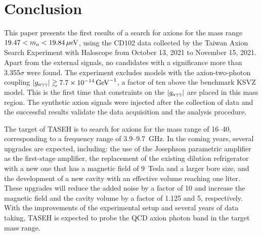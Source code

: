 \section{Conclusion} \label{sec:conclusion}
This paper presents the first results of a search for axions for the mass 
range $19.47 < m_a < 19.84 \,\mu\text{e\hspace{-.08em}V}$, using the CD102 data collected by the 
Taiwan Axion Search Experiment with Haloscope from October 13, 2021 
to November 15, 2021. 
Apart from the external signals, no candidates with a significance more than
3.355$\sigma$ were found. The experiment excludes models with the 
axion-two-photon coupling $\left|g_{a\gamma\gamma}\right|\gtrsim 7.7\times 10^{-14}\,\text{Ge\hspace{-.08em}V}^{-1}$, a factor of ten 
above the benchmark KSVZ model. This is the first time that 
constraints on the $\left|g_{a\gamma\gamma}\right|$ are placed in this mass region. The synthetic 
axion signals were injected after the collection of data and the 
successful results validate the data acquisition and the analysis procedure. 

The target of TASEH is to search for axions for the mass range of 
16--40\muevcc, corresponding to a frequency range of 3.9--9.7~GHz. 
In the coming years, several upgrades are expected, including: the use of 
the Josephson parametric amplifier as the first-stage amplifier, the 
replacement of the existing dilution refrigerator with a new one that has 
a magnetic field of 9~Tesla and a larger bore size, and the development of 
a new cavity with an effective volume reaching one liter. These upgrades 
will reduce the added noise by a factor of 10 and increase the magnetic 
field and the cavity volume by a factor of 1.125 and 5, respectively. With the 
improvements of the experimental setup and several years of data taking, 
TASEH is expected to probe the QCD axion photon band in the target mass range.


